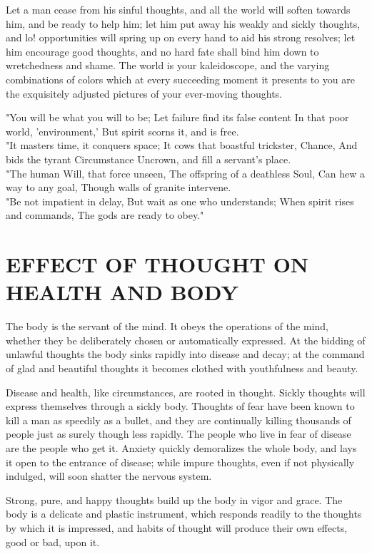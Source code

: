\documentclass[10pt]{article}
\begin{document}
Let a man cease from his sinful thoughts, and all the world will soften towards him, and be ready to help him; let him put away his weakly and sickly thoughts, and lo! opportunities will spring up on every hand to aid his strong resolves; let him encourage good thoughts, and no hard fate shall bind him down to wretchedness and shame. The world is your kaleidoscope, and the varying combinations of colors which at every succeeding moment it presents to you are the exquisitely adjusted pictures of your ever-moving thoughts.

\begin{displayquote}
"You will be what you will to be; Let failure find its false content In that poor world, 'environment,' But spirit scorns it, and is free.\\
"It masters time, it conquers space; It cows that boastful trickster, Chance, And bids the tyrant Circumstance Uncrown, and fill a servant's place.\\
"The human Will, that force unseen, The offspring of a deathless Soul, Can hew a way to any goal, Though walls of granite intervene.\\
"Be not impatient in delay, But wait as one who understands; When spirit rises and commands, The gods are ready to obey."
\end{displayquote}

\section*{EFFECT OF THOUGHT ON HEALTH AND BODY}
The body is the servant of the mind. It obeys the operations of the mind, whether they be deliberately chosen or automatically expressed. At the bidding of unlawful thoughts the body sinks rapidly into disease and decay; at the command of glad and beautiful thoughts it becomes clothed with youthfulness and beauty.

Disease and health, like circumstances, are rooted in thought. Sickly thoughts will express themselves through a sickly body. Thoughts of fear have been known to kill a man as speedily as a bullet, and they are continually killing thousands of people just as surely though less rapidly. The people who live in fear of disease are the people who get it. Anxiety quickly demoralizes the whole body, and lays it open to the entrance of disease; while impure thoughts, even if not physically indulged, will soon shatter the nervous system.

Strong, pure, and happy thoughts build up the body in vigor and grace. The body is a delicate and plastic instrument, which responds readily to the thoughts by which it is impressed, and habits of thought will produce their own effects, good or bad, upon it.
\end{document}
